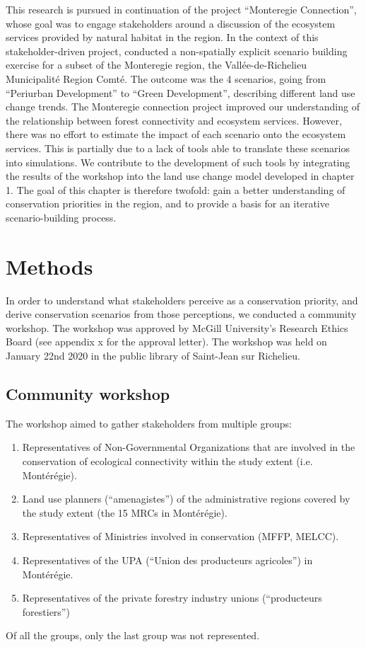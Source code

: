 This research is pursued in continuation of the project “Monteregie Connection”, whose goal was to engage stakeholders around a discussion of the ecosystem services provided by natural habitat in the region. In the context of this stakeholder-driven project, \cite{mitchell_monteregie_2015} conducted a non-spatially explicit scenario building exercise for a subset of the Monteregie region, the Vallée-de-Richelieu Municipalité Region Comté. The outcome was the 4 scenarios, going from “Periurban Development” to “Green Development”, describing different land use change trends. The Monteregie connection project improved our understanding of the relationship between forest connectivity and ecosystem services. However, there was no effort to estimate the impact of each scenario onto the ecosystem services. This is partially due to a lack of tools able to translate these scenarios into simulations. We contribute to the development of such tools by integrating the results of the workshop into the land use change model developed in chapter 1. The goal of this chapter is therefore twofold: gain a better understanding of conservation priorities in the region, and to provide a basis for an iterative scenario-building process. 
\\

\section{Methods}

In order to understand what stakeholders perceive as a conservation priority, and derive conservation scenarios from those perceptions, we conducted a community workshop. The workshop was approved by McGill University’s Research Ethics Board (see appendix {x} for the approval letter). The workshop was held on January 22nd 2020 in the public library of Saint-Jean sur Richelieu. \\

\subsection{Community workshop}

The workshop aimed to gather stakeholders from multiple groups:
\begin{enumerate}
  \item Representatives of Non-Governmental Organizations that are involved in the conservation of ecological connectivity within the study extent (i.e. Montérégie).
  \item Land use planners (“amenagistes”) of the administrative regions covered by the study extent (the 15 MRCs in Montérégie).
  \item Representatives of Ministries involved in conservation (MFFP, MELCC).
  \item Representatives of the UPA (“Union des producteurs agricoles”) in Montérégie.
  \item Representatives of the private forestry industry unions (“producteurs forestiers”)
\end{enumerate}
Of all the groups, only the last group was not represented. \\

